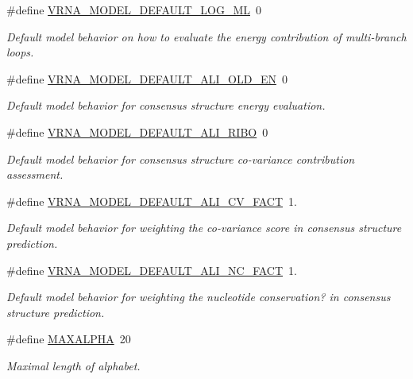 \begin{DoxyCompactItemize}
\#define \hyperlink{group__model__details_ga938f68463e84fe060aa6502f428a517d}{V\+R\+N\+A\+\_\+\+M\+O\+D\+E\+L\+\_\+\+D\+E\+F\+A\+U\+L\+T\+\_\+\+L\+O\+G\+\_\+\+ML}~0
\begin{DoxyCompactList}\small\item\em Default model behavior on how to evaluate the energy contribution of multi-\/branch loops. \end{DoxyCompactList}\item 
\#define \hyperlink{group__model__details_ga2a5bbfc1edf33077e39466d2d9807115}{V\+R\+N\+A\+\_\+\+M\+O\+D\+E\+L\+\_\+\+D\+E\+F\+A\+U\+L\+T\+\_\+\+A\+L\+I\+\_\+\+O\+L\+D\+\_\+\+EN}~0
\begin{DoxyCompactList}\small\item\em Default model behavior for consensus structure energy evaluation. \end{DoxyCompactList}\item 
\#define \hyperlink{group__model__details_ga64b3ab65a9ca42d4ad1d05e193083147}{V\+R\+N\+A\+\_\+\+M\+O\+D\+E\+L\+\_\+\+D\+E\+F\+A\+U\+L\+T\+\_\+\+A\+L\+I\+\_\+\+R\+I\+BO}~0
\begin{DoxyCompactList}\small\item\em Default model behavior for consensus structure co-\/variance contribution assessment. \end{DoxyCompactList}\item 
\#define \hyperlink{group__model__details_gaaaf3d73d6abc18d3889676952bfedb96}{V\+R\+N\+A\+\_\+\+M\+O\+D\+E\+L\+\_\+\+D\+E\+F\+A\+U\+L\+T\+\_\+\+A\+L\+I\+\_\+\+C\+V\+\_\+\+F\+A\+CT}~1.
\begin{DoxyCompactList}\small\item\em Default model behavior for weighting the co-\/variance score in consensus structure prediction. \end{DoxyCompactList}\item 
\#define \hyperlink{group__model__details_ga8f774daaafec28160c1ca5d09f2cbdba}{V\+R\+N\+A\+\_\+\+M\+O\+D\+E\+L\+\_\+\+D\+E\+F\+A\+U\+L\+T\+\_\+\+A\+L\+I\+\_\+\+N\+C\+\_\+\+F\+A\+CT}~1.
\begin{DoxyCompactList}\small\item\em Default model behavior for weighting the nucleotide conservation? in consensus structure prediction. \end{DoxyCompactList}\item 
\mbox{\label{group__model__details_ga05a5ffe718aa431d97419a12fb082379}} 
\#define \hyperlink{group__model__details_ga05a5ffe718aa431d97419a12fb082379}{M\+A\+X\+A\+L\+P\+HA}~20
\begin{DoxyCompactList}\small\item\em Maximal length of alphabet. \end{DoxyCompactList}\end{DoxyCompactItemize}

